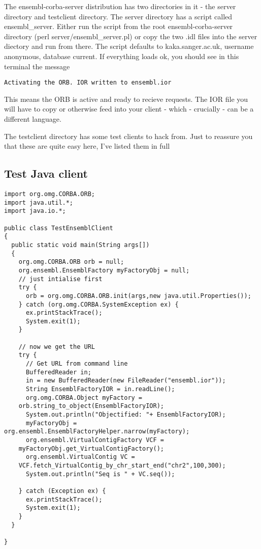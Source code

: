 \documentclass[11pt,a4paper]{article}
\begin{document}
The ensembl-corba-server distribution has two directories in it - the 
server directory and testclient directory. The server directory has a script
called ensembl\_server. Either run the script from the root ensembl-corba-server
directory (perl server/ensembl\_server.pl) or copy the two .idl files into the
server diectory and run from there. The script defaults to kaka.sanger.ac.uk, 
username anonymous, database current. If everything loads ok, you should see in this
terminal the message

\begin{verbatim}
Activating the ORB. IOR written to ensembl.ior
\end{verbatim}

This means the ORB is active and ready to recieve requests. The IOR file you will have
to copy or otherwise feed into your client - which - crucially - can be a different
language.

The testclient directory has some test clients to hack from. Just to reassure you that these
are quite easy here, I've listed them in full

\subsection{Test Java client}


\begin{verbatim}
import org.omg.CORBA.ORB;
import java.util.*;
import java.io.*;

public class TestEnsemblClient 
{
  public static void main(String args[]) 
  {
    org.omg.CORBA.ORB orb = null;
    org.ensembl.EnsemblFactory myFactoryObj = null;
    // just intialise first
    try {
      orb = org.omg.CORBA.ORB.init(args,new java.util.Properties());
    } catch (org.omg.CORBA.SystemException ex) {
      ex.printStackTrace();
      System.exit(1);
    }
    
    // now we get the URL
    try {
      // Get URL from command line      
      BufferedReader in;
      in = new BufferedReader(new FileReader("ensembl.ior"));
      String EnsemblFactoryIOR = in.readLine();
      org.omg.CORBA.Object myFactory = 
	orb.string_to_object(EnsemblFactoryIOR);
      System.out.println("Objectified: "+ EnsemblFactoryIOR);
      myFactoryObj = org.ensembl.EnsemblFactoryHelper.narrow(myFactory);
      org.ensembl.VirtualContigFactory VCF =
	myFactoryObj.get_VirtualContigFactory();
      org.ensembl.VirtualContig VC =
	VCF.fetch_VirtualContig_by_chr_start_end("chr2",100,300);
      System.out.println("Seq is " + VC.seq());
      
    } catch (Exception ex) {
      ex.printStackTrace();
      System.exit(1);
    }       
  }
  
}
\end{verbatim}
\end{document}
